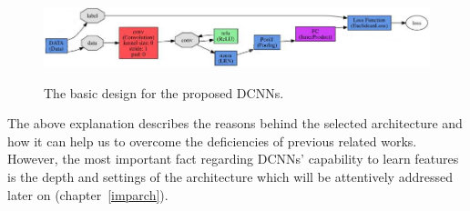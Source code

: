 \begin{figure}[H]
	\centering
	{\includegraphics[width=1\textwidth]{images/dcnn}}
	\caption{The basic design for the proposed DCNNs.}
	\label{fig:proposenet}
\end{figure}

The above explanation describes the reasons behind the selected architecture and how it can help us to overcome the deficiencies of previous related works. However, the most important fact regarding DCNNs' capability to learn features is the depth and settings of the architecture which will be attentively addressed later on (chapter~\ref{imparch}).  